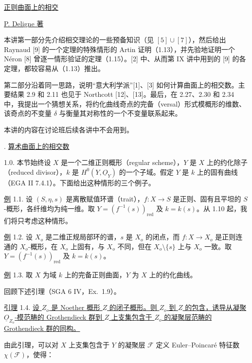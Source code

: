 
\begin{center}
\underline{正则曲面上的相交}

\medskip
\underline{P. Deligne 著}
\end{center}

本讲第一部分先介绍相交理论的一些预备知识（见 $[5]\cup[7]$），然后给出 Raynaud [9] 的一个定理的特殊情形的 Artin 证明（1.13），并先验地证明一个 Néron [8] 曾逐一情形验证的定理（1.15）。[2] 中、从而第 IX 讲中用到的 [9] 的各定理，都较容易从（1.13）推出。

第二部分沿着同一思路，说明“意大利学派”[1]、[3] 如何计算曲面上的相交数。主要结果 2.9 和 2.11 也见于 Northcott [12]、[13]。最后，在 2.27、2.30 和 2.34 中，我提出一个猜想关系，将约化曲线奇点的完备（versal）形式模概形的维数、该奇点的不变量 $\delta$ 与衡量其对称性的一个不变量联系起来。

本讲的内容在讨论班后续各讲中不会用到。

. \underline{算术曲面上的相交数}

1.0. 本节始终设 $X$ 是一个二维正则概形（regular scheme），$Y$ 是 $X$ 上的约化除子（reduced divisor），$k$ 是 $H^0(Y,\underline{O}_Y)$ 的一个子域。假定 $Y$ 是 $k$ 上的固有曲线（EGA II 7.4.1）。下面给出这种情形的三个例子。

\underline{例} 1.1. 设 $(S,\eta,s)$ 是离散赋值环谱（trait），$f:X\longrightarrow S$ 是正则、固有且平坦的 $S$-概形，各纤维均为纯一维。取 $Y=(f^{-1}(s))_{\mathrm{red}}$ 及 $k=k(s)$。从 1.10 起，我们将只考虑这种情形。


\underline{例} 1.2. 设 $X_o$ 是二维正规局部环的谱，$s$ 是 $X_o$ 的闭点，而 $f:X\longrightarrow X_o$ 是正则连通的 $X_o$-概形，在 $X_o$ 上固有，与 $X_o$ 不同，但在 $X_o\setminus\{s\}$ 上与 $X_o$ 一致。取 $Y=(f^{-1}(s))_{\mathrm{red}}$ 及 $k=k(s)$。

\underline{例} 1.3. 取 $X$ 为域 $k$ 上的完备正则曲面，$Y$ 为 $X$ 上的约化曲线。

回顾下述引理（SGA 6 IV，Ex.~1.9）。

\underline{引理} 1.4. \underline{设 $Z_o$ 是 Noether 概形 $Z$ 的闭子概形。则 $Z_o$ 到 $Z$ 的包含，诱导从凝聚 $\underline{O}_{Z_o}$-模范畴的 Grothendieck 群到 $Z$ 上支集包含于 $Z_o$ 的凝聚层范畴的 Grothendieck 群的同构。}

由此引理，可以对 $X$ 上支集包含于 $Y$ 的凝聚层 $\mathcal F$ 定义 Euler--Poincaré 特征数 $\chi(\mathcal F)$，使得：

